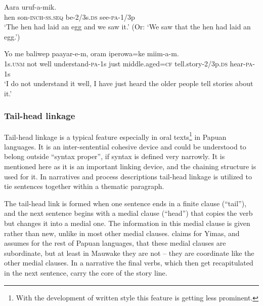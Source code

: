 \ea%
\label{ex:8:x1510}
\gll Aara    uruf-a-mik.\\
hen  son-\textsc{inch}-\textsc{ss}.\textsc{seq} be-2/3s.\textsc{ds} see-\textsc{pa}-1/3p\\
\glt`The hen had laid an egg and we saw it.' (Or: `We saw that the hen had laid an egg.')
\z


\ea%
\label{ex:8:x1511}
\gll Yo  me  baliwep  paayar-e-m,  oram  iperowa=ke \textstyleEmphasizedVernacularWords{-}  miim-a-m.\\
1s.\textsc{unm} not  well  understand-\textsc{pa}-1s  just  middle.aged=\textsc{cf} tell.story-2/3p.\textsc{ds} hear-\textsc{pa}-1s     \\
\glt`I do not understand it well, I have just heard the older people tell stories about it.'
\z


\subsubsection{Tail-head linkage} \label{sec:8.2.3.5}

Tail-head linkage is a typical feature especially in oral texts\footnote{With the development of written style this feature is getting less prominent.}  in Papuan languages. It is an inter-sentential cohesive device and could be understood to belong outside ``syntax proper'', if syntax is defined very narrowly. It is mentioned here as it is an important linking device, and the chaining structure is used for it. In narratives and process descriptions tail-head linkage is utilized to tie sentences together within a thematic paragraph. 

 The tail-head link is formed when one sentence ends in a finite clause (``tail''), and the next sentence begins with a medial clause (``head'') that copies the verb but changes it into a medial one. The information in this medial clause is given rather than new, unlike in most other medial clauses. \citet[200--201]{Foley1986} claims for Yimas, and assumes for the rest of Papuan languages, that these medial clauses are subordinate, but at least in Mauwake they are not -- they are coordinate like the other medial clauses. In a narrative the final verbs, which then get recapitulated in the next sentence, carry the core of the story line.

